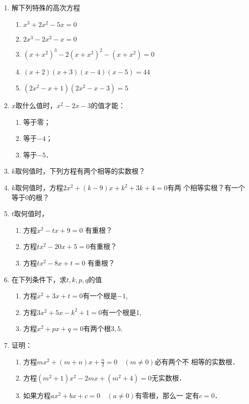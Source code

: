 \begin{enumerate}
\item 解下列特殊的高次方程
\begin{enumerate}
    \item $x^{3}+2 x^{2}-5 x=0$
    \item  $2 x^{3}-2 x^{2}-x=0$
    \item $\left(x+x^{2}\right)^{3}-2\left(x+x^{2}\right)^{2}-\left(x+x^{2}\right)=0$
    \item $(x+2)(x+3)(x-4)(x-5)=44$
    \item $(2x^2-x+1)(2x^2-x-3)=5$
\end{enumerate}

\item $x$取什么值时，$x^2-2x-3$的值才能：
\begin{multicols}{3}
\begin{enumerate}
    \item 等于零；
    \item 等于$-4$；
    \item 等于$-5$．
\end{enumerate}
\end{multicols}

\item $k$取何值时，下列方程有两个相等的实数根？
\begin{enumerate}
\end{enumerate}

\item $k$取何值时，方程$2x^2+(k-9)x+k^2+3k+4=0$有两
个相等实根？有一个等于0的根？
\item $t$取何值时，
\begin{enumerate}
    \item 方程$x^2-tx+9=0$ 有重根？
    \item 方程$tx^2-20x+5=0$有重根？
    \item 方程$tx^2-8x+t=0$ 有重根？
\end{enumerate}

\item 在下列条件下，求$t,k,p,q$的值
\begin{enumerate}
    \item 方程$x^2+3x+t=0$有一个根是$-1$,
    \item 方程$3x^2+5x-k^2+1=0$有一个根是1,
    \item 方程$ x^2+px+q=0$有两个根$3,5$.
\end{enumerate}
\item 证明：
\begin{enumerate}
    \item 方程$mx^2+(m+n)x+\frac{n}{2}=0\quad (m\ne 0)$必有两个不
相等的实数根．
\item 方程$(m^2+1)x^2-2mx+(m^2+4)=0$无实数根．
\item 如果方程$ax^2+bx+c=0\quad (a\ne 0)$有零根，那么一
定有$c=0$．
\end{enumerate}



\end{enumerate}
